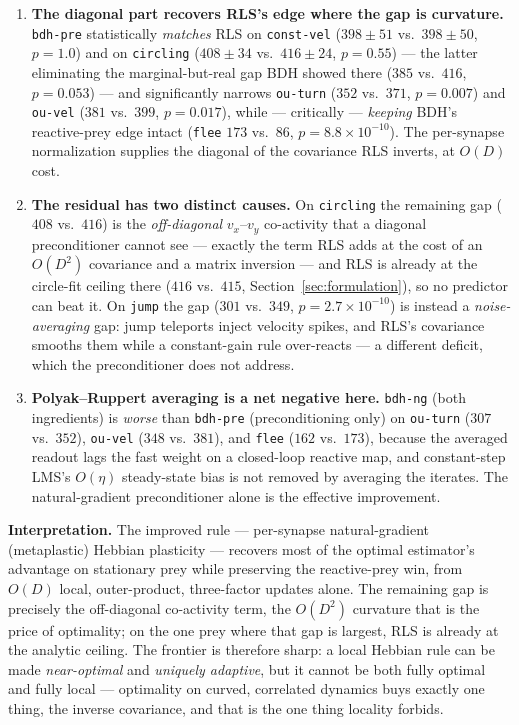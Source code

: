 \documentclass[11pt]{article}
\begin{document}
\begin{enumerate}
\item \textbf{The diagonal part recovers RLS's edge where the gap is curvature.} \texttt{bdh-pre}
  statistically \emph{matches} RLS on \texttt{const-vel} ($398 \pm 51$ vs.\ $398 \pm 50$,
  $p = 1.0$) and on \texttt{circling} ($408 \pm 34$ vs.\ $416 \pm 24$, $p = 0.55$) --- the latter
  eliminating the marginal-but-real gap BDH showed there ($385$ vs.\ $416$, $p = 0.053$) --- and
  significantly narrows \texttt{ou-turn} ($352$ vs.\ $371$, $p = 0.007$) and \texttt{ou-vel}
  ($381$ vs.\ $399$, $p = 0.017$), while --- critically --- \emph{keeping} BDH's reactive-prey
  edge intact (\texttt{flee} $173$ vs.\ $86$, $p = 8.8 \times 10^{-10}$). The per-synapse
  normalization supplies the diagonal of the covariance RLS inverts, at $O(D)$ cost.
\item \textbf{The residual has two distinct causes.} On \texttt{circling} the remaining gap
  ($408$ vs.\ $416$) is the \emph{off-diagonal} $v_x$--$v_y$ co-activity that a diagonal
  preconditioner cannot see --- exactly the term RLS adds at the cost of an $O(D^2)$ covariance
  and a matrix inversion --- and RLS is already at the circle-fit ceiling there ($416$ vs.\ $415$,
  Section~\ref{sec:formulation}), so no predictor can beat it. On \texttt{jump} the gap ($301$
  vs.\ $349$, $p = 2.7 \times 10^{-10}$) is instead a \emph{noise-averaging} gap: jump teleports
  inject velocity spikes, and RLS's covariance smooths them while a constant-gain rule over-reacts
  --- a different deficit, which the preconditioner does not address.
\item \textbf{Polyak--Ruppert averaging is a net negative here.} \texttt{bdh-ng} (both
  ingredients) is \emph{worse} than \texttt{bdh-pre} (preconditioning only) on \texttt{ou-turn}
  ($307$ vs.\ $352$), \texttt{ou-vel} ($348$ vs.\ $381$), and \texttt{flee} ($162$ vs.\ $173$),
  because the averaged readout lags the fast weight on a closed-loop reactive map, and
  constant-step LMS's $O(\eta)$ steady-state bias is not removed by averaging the iterates. The
  natural-gradient preconditioner alone is the effective improvement.
\end{enumerate}

\textbf{Interpretation.} The improved rule --- per-synapse natural-gradient (metaplastic)
Hebbian plasticity --- recovers most of the optimal estimator's advantage on stationary prey
while preserving the reactive-prey win, from $O(D)$ local, outer-product, three-factor updates
alone. The remaining gap is precisely the off-diagonal co-activity term, the $O(D^2)$ curvature
that is the price of optimality; on the one prey where that gap is largest, RLS is already at the
analytic ceiling. The frontier is therefore sharp: a local Hebbian rule can be made
\emph{near-optimal} and \emph{uniquely adaptive}, but it cannot be both fully optimal and fully
local --- optimality on curved, correlated dynamics buys exactly one thing, the inverse
covariance, and that is the one thing locality forbids.
\end{document}
